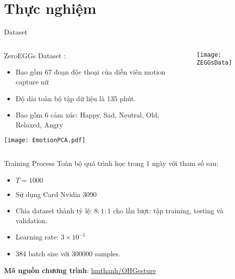 
\section{Thực nghiệm}

\begin{frame}{Dataset}
	

\begin{columns}
	\begin{column}{0.6\textwidth}
		ZeroEGGs Dataset \cite{ghorbani2023zeroeggs}:
		
		\begin{itemize}
			\item Bao gồm 67 đoạn độc thoại của diễn viên motion capture nữ
			\item Độ dài toàn bộ tập dữ liệu là 135 phút.
			\item Bao  gồm 6 cảm xúc: Happy,  Sad, Neutral, Old, Relaxed, Angry
		\end{itemize}
		\texttt{[image: EmotionPCA.pdf]}
	\end{column}
	
	\begin{column}{0.4\textwidth}
		\texttt{[image: ZEGGsData]}
	\end{column}
\end{columns}
\end{frame}



\begin{frame}{Training Process}
	Toàn bộ quá trình học trong 1 ngày với tham số sau:
\begin{itemize}
	\item $T = 1000$
	\item Sử dụng Card Nvidia 3090
	\item Chia dataset thành tỷ lệ: $8:1:1$ cho lần lượt: tập training, testing và validation.
	\item Learning rate: $3 \times 10^{-5}$
	\item 384 batch size với 300000 samples.
	\end{itemize}
	
	\textbf{Mã nguồn chương trình}: \hyperlink{https://github.com/hmthanh/OHGesture}{hmthanh/OHGesture}
\end{frame}
